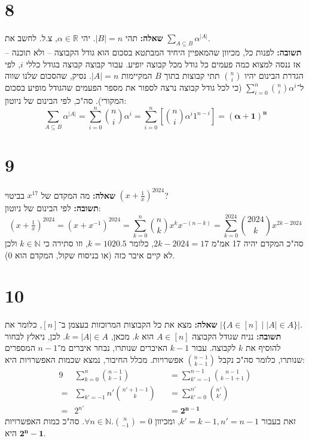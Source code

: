 \documentclass[]{article}
\newcommand\N     {\mathbb{N}}
\newcommand\R     {\mathbb{R}}
\newcommand\sumnk {\sum_{k = 0}^{n}}
\begin{document}
	\section*{8} %
	\textbf{שאלה: }תהי $|B| = n$. יהי $\alpha \in \R$, צ.ל. לחשב את $\sum_{A \subseteq B}\alpha^{|A|}$. \\
	\textbf{תשובה: }לפנות כל, מכיוון שהמאפיין היחיד המבתטא בסכום הוא גודל הקבוצה – ולא תוכנה – אז ננסה למצוא כמה פעמים כל גודל מכל קבוצה יופיע. עבור קבוצה קבוצה בגודל כללי $i$, לפי הגדרת הבינום יהיו $\binom{n}{i}$ תתי קבוצות בתוך $B$ המקיימות $|A| = n$. נסיק, שהסכום שלנו שווה ל־$\sum_{i = 0}^{n}\binom{n}{i}\alpha^i $ (כי לכל גודל קבוצה נרצה לספור את מספר הפעמים שהגודל מופיע בסכום המקורי). סה"כ, לפי הבינום של ניוטון: 
	\[ \sum_{A \subseteq B}\alpha^{|A|}
	 = \sum_{i = 0}^{n}\binom{n}{i}\alpha^i
	 = \sum_{i = 0}^{n}\left [ \binom{n}{i}\alpha^i1^{n - i} \right ]
	 = \bm{(\alpha + 1)^n} \]
	\section*{9} %
	\textbf{שאלה: }מה המקדם של $x^{17}$ בביטוי $\left (x + \tfrac{1}{x}\right )^{2024}$? \\
	\textbf{תשובה: }לפי הבינום של ניוטון: 
	\[ \left (x + \tfrac{1}{x}\right )^{2024} = \left (x + x^{-1} \right )^{2024} = \sum_{k = 0}^{n}\binom{n}{k}x^k x^{-(n  - k)}= \sum_{k = 0}^{2024}\binom{2024}{k}x^{2k - 2024} \]
	סה"כ המקדם יהיה 17 אמ"מ $ 2k - 2024 = 17 $, כלומר $ k = 1020.5 $, וזו סתירה כי $k \in \N$ ולכן לא קיים איבר כזה (או בניסוח שקול, המקדם הוא $0$). 
	\section*{10} %
	\textbf{שאלה: }מצא את כל הקבוצות המרוכזות בעצמן ב־$[n]$, כלומר את $|\{A \in [n] \mid |A| \in A\}|$. \\
	\textbf{תשובה: }
		נניח שגודל הקבוצה $A \in [n]$ הוא $k$. מכאן, $k = |A| \in A$. לכן, ניאלץ לבחור להוסיף את $k$ לקבוצה. עבור $k - 1$ האיברים שנותרו, נבחר איברים מ־$n - 1 $ המספרים שנותרו, כלומר סה"כ נקבל $\binom{n - 1}{k - 1}$ אפשרויות. מכלל החיבור, נמצא שכמות האפשרויות היא: 
	\begin{alignat*}{9}
		\; & \sumnk\binom{n - 1}{k - 1} &&= \sum_{k' = - 1}^{n - 1} \binom{n - 1}{k - 1 + 1} \\
		\; = &\sum_{k' = -1}{n'}\binom{n' + 1 - 1}{k} &&= \sum_{k' = 0}^{n'}\binom{n'}{k'} \\
		\; = &2^{n'} &&= \bm{2^{n - 1}}
 	\end{alignat*}
 	זאת בעבור $k' = k - 1, n' = n - 1 $, ומכיוון $ \forall n \in \N. \binom{n}{-1} = 0 $. סה"כ כמות האפשרויות היא $ \bm{2^n - 1} $. 
 	
\end{document}
